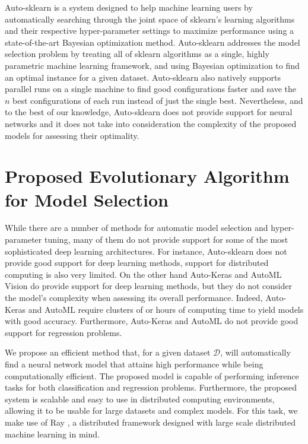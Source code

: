 \documentclass[preprint,12pt]{elsarticle}%
\begin{document}
Auto-sklearn \cite{Feurer2015} is a system designed to help machine learning users by automatically searching through the joint space of sklearn's learning algorithms and their respective hyper-parameter settings to maximize performance using a state-of-the-art Bayesian optimization method. Auto-sklearn addresses the model selection problem by treating all of sklearn algorithms as a single, highly parametric machine learning framework, and using Bayesian optimization to find an optimal instance for a given dataset. Auto-sklearn also natively supports parallel runs on a single machine to find good configurations faster and save the $n$ best configurations of each run instead of just the single best. Nevertheless, and to the best of our knowledge, Auto-sklearn does not provide support for neural networks and it does not take into consideration the complexity of the proposed models for assessing their optimality.


\section{Proposed Evolutionary Algorithm for Model Selection}
\label{sec:auto_nn}

While there are a number of methods for automatic model selection and hyper-parameter tuning, many of them do not provide support for some of the most sophisticated deep learning architectures. For instance, Auto-sklearn does not provide good support for deep learning methods, support for distributed computing is also very limited. On the other hand Auto-Keras and AutoML Vision do provide support for deep learning methods, but they do not consider the model's complexity when assessing its overall performance. Indeed, Auto-Keras and AutoML require clusters of or hours of computing time to yield models with good accuracy. Furthermore, Auto-Keras and AutoML do not provide good support for regression problems. 

We propose an efficient method that, for a given dataset $\mathcal{D}$, will automatically find a neural network model that attains high performance while being computationally efficient. The proposed model is capable of performing inference tasks for both classification and regression problems. Furthermore, the proposed system is scalable and easy to use in distributed computing environments, allowing it to be usable for large datasets and complex models. For this task, we make use of Ray \cite{Moritz2017}, a distributed framework designed with large scale distributed machine learning in mind.
\end{document}
